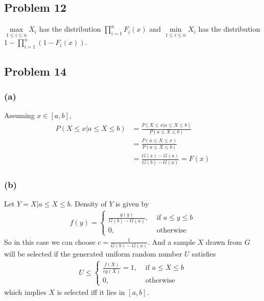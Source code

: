 \documentclass{article}
\begin{document}
\subsection*{Problem 12}
$\underset{1\le i\le n}{\max} X_i$ has the distribution $\prod_{i=1}^n F_i(x)$ and $\underset{1\le i\le n}{\min} X_i$ has the distribution $1-\prod_{i=1}^n (1-F_i(x))$.

\subsection*{Problem 14}
\subsubsection*{(a)}
Assuming $x\in[a, b]$,
\begin{align*}
  P(X\le x| a\le X\le b)
  &= \frac{P(X\le x| a\le X\le b)}{P(a\le X\le b)} \\
  &= \frac{P(a\le X\le x)}{P(a\le X\le b)} \\
  &= \frac{G(x)-G(a)}{G(b)-G(a)} = F(x)
\end{align*}
\subsubsection*{(b)}
Let $Y = X| a\le X\le b$. Density of $Y$ is given by
\begin{align*}
f(y) = \begin{cases}
          \frac{g(y)}{G(b) - G(a)}, & \text{ if } a\le y\le b \\
          0, & \text{ otherwise}
      \end{cases}
\end{align*}
So in this case we can choose $c=\frac{1}{G(b)-G(a)}$. And a sample $X$ drawn from $G$ will be selected if the generated uniform random number $U$ satisfies
\begin{align*}
  U\le  \begin{cases}
            \frac{f(X)}{cg(X)} = 1,  & \text{ if } a\le X\le b\\
            0, & \text{ otherwise}
        \end{cases}
\end{align*}
which implies $X$ is selected iff it lies in $[a, b]$.
\end{document}
